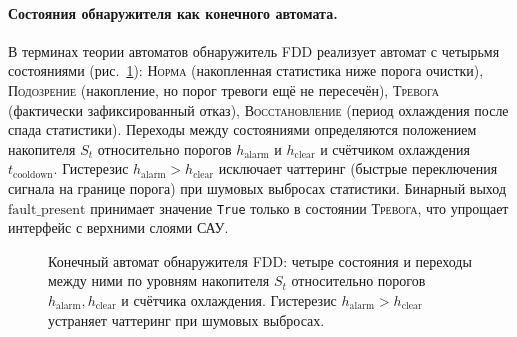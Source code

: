 \documentclass[a4paper,14pt]{extarticle}
\newcommand{\FDD}{\textsc{FDD}}
\begin{document}
\paragraph{Состояния обнаружителя как конечного автомата.} В терминах теории автоматов обнаружитель \FDD{} реализует автомат с четырьмя состояниями (рис.~\ref{fig:fdd-states}): \textsc{Норма} (накопленная статистика ниже порога очистки), \textsc{Подозрение} (накопление, но порог тревоги ещё не пересечён), \textsc{Тревога} (фактически зафиксированный отказ), \textsc{Восстановление} (период охлаждения после спада статистики). Переходы между состояниями определяются положением накопителя $S_t$ относительно порогов $h_\text{alarm}$ и $h_\text{clear}$ и счётчиком охлаждения $t_\text{cooldown}$. Гистерезис $h_\text{alarm} > h_\text{clear}$ исключает чаттеринг (быстрые переключения сигнала на границе порога) при шумовых выбросах статистики. Бинарный выход $\text{fault\_present}$ принимает значение \texttt{True} только в состоянии \textsc{Тревога}, что упрощает интерфейс с верхними слоями САУ.

\begin{figure}[H]
\centering
{}
\caption{Конечный автомат обнаружителя \FDD{}: четыре состояния и переходы между ними по уровням накопителя $S_t$ относительно порогов $h_\text{alarm}, h_\text{clear}$ и счётчика охлаждения. Гистерезис $h_\text{alarm} > h_\text{clear}$ устраняет чаттеринг при шумовых выбросах.}
\label{fig:fdd-states}
\end{figure}
\end{document}
